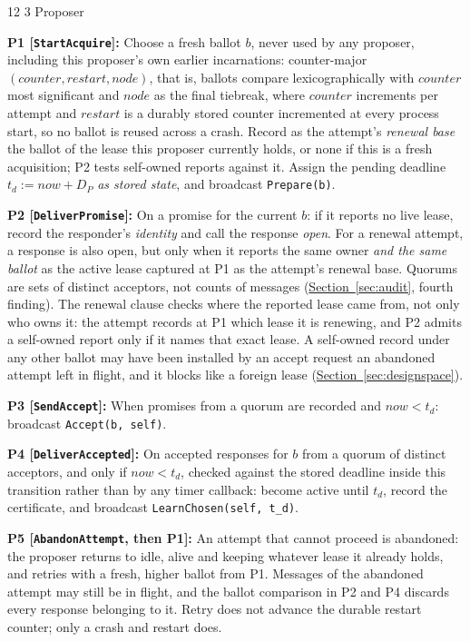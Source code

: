 \documentclass[final,5p,times,twocolumn,number]{elsarticle}
\makeatletter
\newcommand{\code}[1]{\texttt{#1}}
\newcommand{\invitem}[1]{\smallskip\noindent\textbf{#1:} }
\newcommand{\secref}[1]{\hyperref[#1]{Section~\ref*{#1}}}
\renewcommand\subsection{\@startsection{subsection}{2}{\z@}%
           {12\p@ \@plus 6\p@ \@minus 3\p@}%
           {3\p@ \@plus 6\p@ \@minus 3\p@}%
           {\normalfont\normalsize\bfseries}}
\makeatother
\begin{document}
\subsection{Proposer}

\invitem{P1 [\code{StartAcquire}]}Choose a fresh ballot $b$, never used by any proposer, including this proposer's own earlier incarnations: counter-major $(counter, restart, node)$, that is, ballots compare lexicographically with $counter$ most significant and $node$ as the final tiebreak, where $counter$ increments per attempt and $restart$ is a durably stored counter incremented at every process start, so no ballot is reused across a crash.  Record as the attempt's \emph{renewal base} the ballot of the lease this proposer currently holds, or none if this is a fresh acquisition; P2 tests self-owned reports against it.  Assign the pending deadline $t_d := now + D_P$ \emph{as stored state}, and broadcast \code{Prepare(b)}.

\invitem{P2 [\code{DeliverPromise}]}On a promise for the current $b$: if it reports no live lease, record the responder's \emph{identity} and call the response \emph{open}.  For a renewal attempt, a response is also open, but only when it reports the same owner \emph{and the same ballot} as the active lease captured at P1 as the attempt's renewal base.  Quorums are sets of distinct acceptors, not counts of messages (\secref{sec:audit}, fourth finding).  The renewal clause checks where the reported lease came from, not only who owns it: the attempt records at P1 which lease it is renewing, and P2 admits a self-owned report only if it names that exact lease.  A self-owned record under any other ballot may have been installed by an accept request an abandoned attempt left in flight, and it blocks like a foreign lease (\secref{sec:designspace}).

\invitem{P3 [\code{SendAccept}]}When promises from a quorum are recorded and $now < t_d$: broadcast \code{Accept(b, self)}.

\invitem{P4 [\code{DeliverAccepted}]}On accepted responses for $b$ from a quorum of distinct acceptors, and only if $now < t_d$, checked against the stored deadline inside this transition rather than by any timer callback: become active until $t_d$, record the certificate, and broadcast \code{LearnChosen(self, t\_d)}.

\invitem{P5 [\code{AbandonAttempt}, then P1]}An attempt that cannot proceed is abandoned: the proposer returns to idle, alive and keeping whatever lease it already holds, and retries with a fresh, higher ballot from P1.  Messages of the abandoned attempt may still be in flight, and the ballot comparison in P2 and P4 discards every response belonging to it.  Retry does not advance the durable restart counter; only a crash and restart does.
\end{document}
